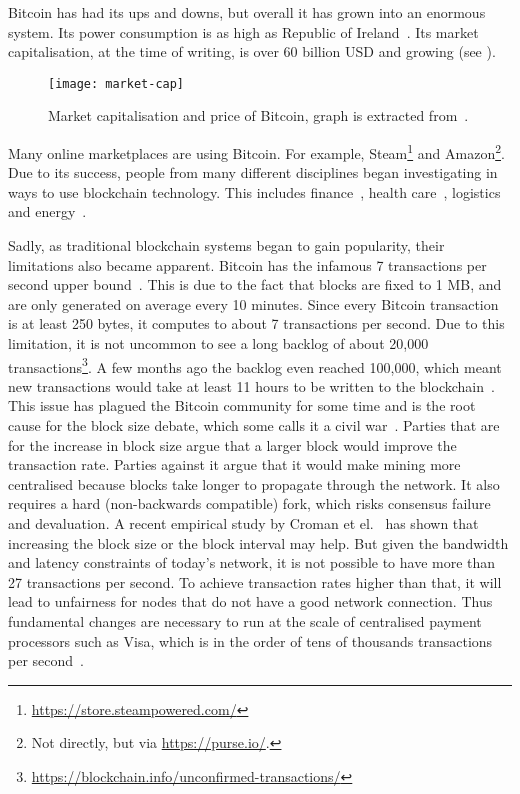 Bitcoin has had its ups and downs, but overall it has grown into an enormous system.
Its power consumption is as high as Republic of Ireland~\cite{o2014bitcoin}.
Its market capitalisation, at the time of writing, is over 60 billion USD and growing (see ).
\begin{figure}[h]
\centering
\texttt{[image: market-cap]}
\caption{Market capitalisation and price of Bitcoin, graph is extracted from~\cite{bitcoinmarketcap}.}
\label{fig:market-cap}
\end{figure}
Many online marketplaces are using Bitcoin.
For example, Steam\footnote{\url{https://store.steampowered.com/}} and Amazon\footnote{Not directly, but via \url{https://purse.io/}.}.
Due to its success, people from many different disciplines began investigating in ways to use blockchain technology.
This includes finance~\cite{finance}, health care~\cite{healthcare}, logistics~\cite{supplychain} and energy~\cite{energy}.

Sadly, as traditional blockchain systems began to gain popularity,
their limitations also became apparent.
Bitcoin has the infamous 7 transactions per second upper bound~\cite{vukolic2015quest}.
This is due to the fact that blocks are fixed to 1 MB,
and are only generated on average every 10 minutes.
Since every Bitcoin transaction is at least 250 bytes, it computes to about 7 transactions per second.
Due to this limitation, it is not uncommon to see a long backlog of about 20,000 transactions\footnote{\url{https://blockchain.info/unconfirmed-transactions/}}.
A few months ago the backlog even reached 100,000, which meant new transactions would take at least 11 hours to be written to the blockchain~\cite{bitcoinbacklog}.
This issue has plagued the Bitcoin community for some time and is the root cause for the block size debate, which some calls it a civil war~\cite{bitcoincivilwar}.
Parties that are for the increase in block size argue that a larger block would improve the transaction rate.
Parties against it argue that it would make mining more centralised because blocks take longer to propagate through the network.
It also requires a hard (non-backwards compatible) fork,
which risks consensus failure and devaluation.
A recent empirical study by Croman et el.~\cite{croman2016scaling} has shown that increasing the block size or the block interval may help.
But given the bandwidth and latency constraints of today's network,
it is not possible to have more than 27 transactions per second.
To achieve transaction rates higher than that, it will lead to unfairness for nodes that do not have a good network connection.
Thus fundamental changes are necessary to run at the scale of centralised payment processors such as Visa,
which is in the order of tens of thousands transactions per second~\cite{visa}.

